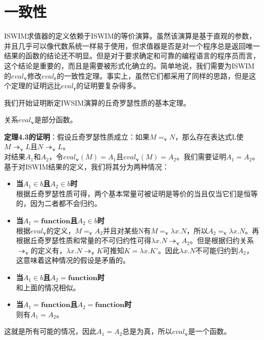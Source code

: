 \documentclass{book}
\def\v{\mathbf{v}}
\def\r{\mathbf{r}}
\begin{document}
\section{一致性}
ISWIM求值器的定义依赖于ISWIM的等价演算。虽然该演算是基于直观的参数，并且几乎可以像代数系统一样易于使用，但求值器是否是对一个程序总是返回唯一结果的函数的结论还不明显。但是对于要求确定和可靠的编程语言的程序员而言，这个结论是重要的，而且是需要被形式化确立的。简单地说，我们需要为ISWIM的$eval_{\mathbf{v}}$修改$eval_\r $的一致性定理。事实上，虽然它们都采用了同样的思路，但是这个定理的证明远比$eval_\r $的证明要复杂得多。\par
我们开始证明断定IWSIM演算的丘奇罗瑟性质的基本定理。
\begin{Theorem}
 关系$eval_{\mathbf{v}}$是部分函数。
\end{Theorem}
\begin{adjustwidth}{20pt}{20pt}
 \textbf{定理4.3的证明}：假设丘奇罗瑟性质成立：如果$M=_{\mathbf{v}}N$，那么存在表达式L使$M\twoheadrightarrow_{\mathbf{v}}L$且$N\twoheadrightarrow_{\mathbf{v}}L$。\\
 对结果$A_1$和$A_2$，令$eval_{\mathbf{v}}(M)=A_1$且$eval_{\mathbf{v}}(M)=A_2$。我们需要证明$A_1=A_2$。基于对ISWIM结果的定义，我们将其分为两种情况：
 \begin{itemize}
  \item \textbf{当$A_1\in b$且$A_2\in b$时}\\
  根据丘奇罗瑟性质可得，两个基本常量可被证明是等价的当且仅当它们是恒等的，因为二者都不会归约。
  \item \textbf{当$A_1=\mathbf{function}$且$A_2\in b$时}\\
  根据$eval_{\mathbf{v}}$的定义，$M=_\v A_2$并且对某些N有$M=_{\mathbf{v}}\lambda x.N$，所以$A_2=_{\mathbf{v}}\lambda x.N$。再根据丘奇罗瑟性质和常量的不可归约性可得$\lambda x.N\twoheadrightarrow_{\mathbf{v}}A_2$。但是根据归约关系$\twoheadrightarrow_{\mathbf{v}}$的定义有，$\lambda x.N\twoheadrightarrow_{\mathbf{v}}K$可推知$K=\lambda x.K'$。因此$\lambda x.N$不可能归约到$A_2$，这意味着这种情况的假设是矛盾的。
  \item \textbf{当$A_1\in b$且$A_2=\mathbf{function}$时}\\
  和上面的情况相似。
  \item \textbf{当$A_1=\mathbf{function}$且$A_2=\mathbf{function}$时}\\
  则有$A_1=A_2$。
  \end{itemize}
这就是所有可能的情况，因此$A_1=A_2$总是为真，所以$eval_{\mathbf{v}}$是一个函数。
\end{adjustwidth}
\end{document}
